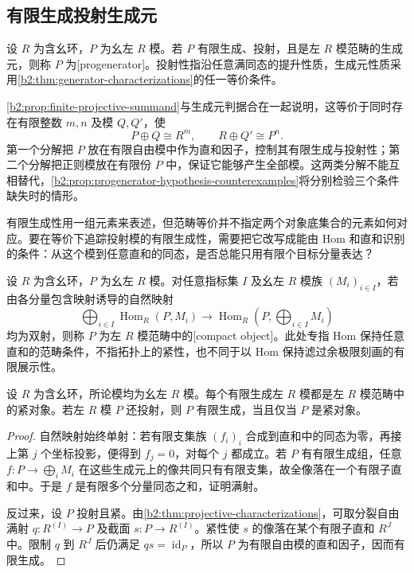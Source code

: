 \subsection{有限生成投射生成元}
\label{b2:subsec:1601:02}

\begin{definition}\label{b2:def:progenerator}
	设 \(R\) 为含幺环，\(P\) 为幺左 \(R\) 模。若 \(P\) 有限生成、投射，且是左 \(R\) 模范畴的生成元，则称 \(P\) 为[progenerator]。投射性指沿任意满同态的提升性质，生成元性质采用\cref{b2:thm:generator-characterizations}的任一等价条件。
\end{definition}

\cref{b2:prop:finite-projective-summand}与生成元判据合在一起说明，这等价于同时存在有限整数 \(m,n\) 及模 \(Q,Q'\)，使
\[
	P\oplus Q\cong R^m,\qquad R\oplus Q'\cong P^n.
\]
第一个分解把 \(P\) 放在有限自由模中作为直和因子，控制其有限生成与投射性；第二个分解把正则模放在有限份 \(P\) 中，保证它能够产生全部模。这两类分解不能互相替代，\cref{b2:prop:progenerator-hypothesis-counterexamples}将分别检验三个条件缺失时的情形。

\ProseParagraphBreak
有限生成性用一组元素来表述，但范畴等价并不指定两个对象底集合的元素如何对应。要在等价下追踪投射模的有限生成性，需要把它改写成能由 Hom 和直和识别的条件：从这个模到任意直和的同态，是否总能只用有限个目标分量表达？

\begin{definition}\label{b2:def:compact-module-object}
	设 \(R\) 为含幺环，\(P\) 为幺左 \(R\) 模。对任意指标集 \(I\) 及幺左 \(R\) 模族 \((M_i)_{i\in I}\)，若由各分量包含映射诱导的自然映射
	\[
		\bigoplus_{i\in I}\operatorname{Hom}_R(P,M_i) \longrightarrow\operatorname{Hom}_R\left(P,\bigoplus_{i\in I}M_i\right)
	\]
	均为双射，则称 \(P\) 为左 \(R\) 模范畴中的[compact object]。此处专指 Hom 保持任意直和的范畴条件，不指拓扑上的紧性，也不同于以 Hom 保持滤过余极限刻画的有限展示性。
\end{definition}

\begin{proposition}\label{b2:prop:compact-projective-finite}
	设 \(R\) 为含幺环，所论模均为幺左 \(R\) 模。每个有限生成左 \(R\) 模都是左 \(R\) 模范畴中的紧对象。若左 \(R\) 模 \(P\) 还投射，则 \(P\) 有限生成，当且仅当 \(P\) 是紧对象。
\end{proposition}
\begin{proof}
	自然映射始终单射：若有限支集族 \((f_i)_i\) 合成到直和中的同态为零，再接上第 \(j\) 个坐标投影，便得到 \(f_j=0\)，对每个 \(j\) 都成立。若 \(P\) 有有限生成组，任意 \(f:P\rightarrow\bigoplus_iM_i\) 在这些生成元上的像共同只有有限支集，故全像落在一个有限子直和中。于是 \(f\) 是有限多个分量同态之和，证明满射。

	反过来，设 \(P\) 投射且紧。由\cref{b2:thm:projective-characterizations}，可取分裂自由满射 \(q:R^{(I)}\rightarrow P\) 及截面 \(s:P\rightarrow R^{(I)}\)。紧性使 \(s\) 的像落在某个有限子直和 \(R^J\) 中。限制 \(q\) 到 \(R^J\) 后仍满足 \(qs=\operatorname{id}_P\)，所以 \(P\) 为有限自由模的直和因子，因而有限生成。
\end{proof}

